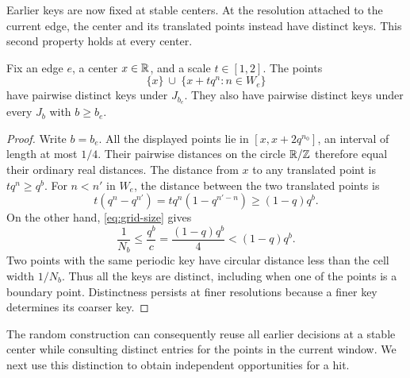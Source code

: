 Earlier keys are now fixed at stable centers.  At the resolution attached
to the current edge, the center and its translated points instead have
distinct keys.  This second property holds at every center.

\begin{lemma}\label{lem:separation}
Fix an edge $e$, a center $x\in\mathbb R$, and a scale $t\in[1,2]$.  The points
\[
 \{x\}\ \cup\ \{x+tq^n:n\in W_e\}
\]
have pairwise distinct keys under $J_{b_e}$.  They also have pairwise
distinct keys under every $J_b$ with $b\ge b_e$.
\end{lemma}

\begin{proof}
Write $b=b_e$.  All the displayed points lie in
$[x,x+2q^{n_0}]$, an interval of length at most $1/4$.  Their pairwise
distances on the circle $\mathbb R/\mathbb Z$ therefore equal their ordinary real
distances.  The distance from $x$ to any translated point is
$tq^n\ge q^b$.  For $n<n'$ in $W_e$, the distance between the two
translated points is
\[
 t(q^n-q^{n'})=tq^n(1-q^{n'-n})\ge(1-q)q^b.
\]
On the other hand, \eqref{eq:grid-size} gives
\[
 \frac1{N_b}\le\frac{q^b}{c}
 =\frac{(1-q)q^b}{4}<(1-q)q^b.
\]
Two points with the same periodic key have circular distance less than
the cell width $1/N_b$.  Thus all the keys are distinct, including when
one of the points is a boundary point.  Distinctness persists at finer
resolutions because a finer key determines its coarser key.
\end{proof}

The random construction can consequently reuse all earlier decisions at
a stable center while consulting distinct entries for the points in the
current window.  We next use this distinction to obtain independent
opportunities for a hit.
